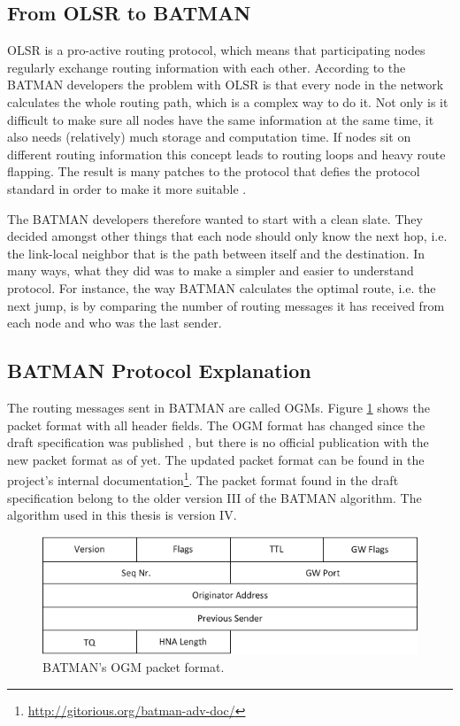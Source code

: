 \subsection{From OLSR to BATMAN}
OLSR is a pro-active routing protocol, which means that participating nodes
regularly exchange routing information with each other. According to the BATMAN
developers the problem with OLSR is that every node in the network calculates
the whole routing path, which is a complex way to do it. Not only is it
difficult to make sure all nodes have the same information at the same time,
it also needs (relatively) much storage and computation time. If nodes sit on
different routing information this concept leads to routing loops and heavy
route flapping. The result is many patches to the protocol that defies the
protocol standard in order to make it more suitable \cite{why-starting-batman}.

The BATMAN developers therefore wanted to start with a clean slate. They decided
amongst other things that each node should only know the next hop, i.e. the
link-local neighbor that is the path between itself and the destination. In
many ways, what they did was to make a simpler and easier to understand
protocol. For instance, the way BATMAN calculates the optimal route, i.e. the
next jump, is by comparing the number of routing messages it has received from
each node and who was the last sender.

\subsection{BATMAN Protocol Explanation}
The routing messages sent in BATMAN are called \acp{OGM}. Figure
\ref{fig:original_ogm} shows the packet format with all header fields. The
\ac{OGM} format has changed since the draft specification was published
\cite{batman_rfc}, but there is no official publication with the new packet
format as of yet. The updated packet format can be found in the project's
internal documentation\footnote{\url{http://gitorious.org/batman-adv-doc/}}.
The packet format found in the draft specification belong to the older version
III of the BATMAN algorithm. The algorithm used in this thesis is version IV.

\begin{figure}[h]
	\centering
  	\includegraphics[width=\textwidth]{images/original_ogm.png}
  	\caption{BATMAN's \acf{OGM} packet format.}
	\label{fig:original_ogm}
\end{figure}

